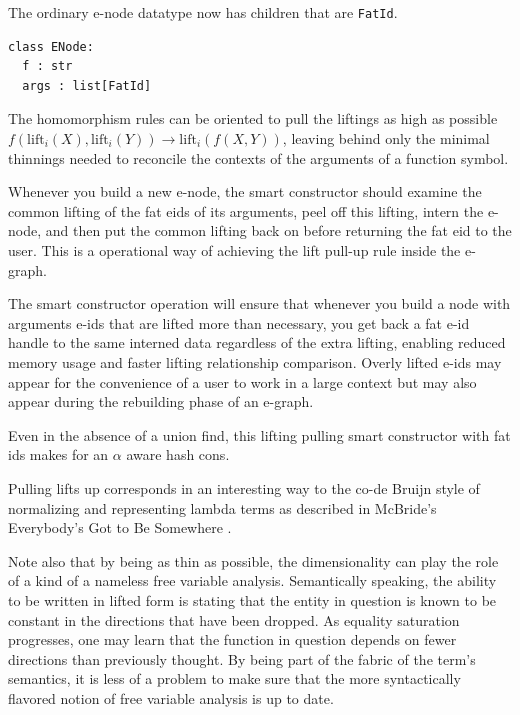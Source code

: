 \documentclass{article}%
\newcommand{\lift}{\text{lift}}
\begin{document}
The ordinary e-node datatype now has children that are \lstinline|FatId|.

\begin{lstlisting}
class ENode:
  f : str
  args : list[FatId]
\end{lstlisting}

The homomorphism rules can be oriented to pull the liftings as high as possible  $f(\lift_i(X), \lift_i(Y)) \to \lift_i(f(X,Y))$, leaving behind only the minimal thinnings needed to reconcile the contexts of the arguments of a function symbol.


Whenever you build a new e-node, the smart constructor should examine the common lifting of the fat eids of its arguments, peel off this lifting, intern the e-node, and then put the common lifting back on before returning the fat eid to the user. This is a operational way of achieving the lift pull-up rule inside the e-graph.

The smart constructor operation will ensure that whenever you build a node with arguments e-ids that are lifted more than necessary, you get back a fat e-id handle to the same interned data regardless of the extra lifting, enabling reduced memory usage and faster lifting relationship comparison. Overly lifted e-ids may appear for the convenience of a user to work in a large context but may also appear during the rebuilding phase of an e-graph.


Even in the absence of a union find, this lifting pulling smart constructor with fat ids makes for an $\alpha$ aware hash cons. \cite{zucker2026alphaequival} \cite{hashalpha}

Pulling lifts up corresponds in an interesting way to the co-de Bruijn style of normalizing and representing lambda terms as described in McBride's Everybody's Got to Be Somewhere \cite{McBride_2018} . 

Note also that by being as thin as possible, the dimensionality can play the role of a kind of a nameless free variable analysis. Semantically speaking, the ability to be written in lifted form is stating that the entity in question is known to be constant in the directions that have been dropped. As equality saturation progresses, one may learn that the function in question depends on fewer directions than previously thought. By being part of the fabric of the term's semantics, it is less of a problem to make sure that the more syntactically flavored notion of free variable analysis is up to date.
\end{document}
